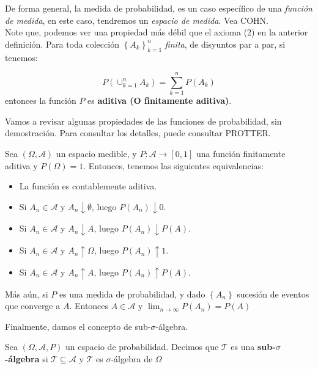 De forma general, la medida de probabilidad, es un caso específico de una \textit{función de medida}, en este caso, tendremos un \textit{espacio de medida}. Vea COHN.\\

Note que, podemos ver una propiedad más débil que el axioma (2) en la anterior definición. Para toda colección $\left\{  A_k \right\}_{k = 1}^{n}$ \textit{finita}, de disyuntos par a par, si tenemos:

\[
	P\left( \cup_{k=1}^n A_k \right) = \sum_{k = 1}^{n} P(A_k)
\]
entonces la función $P$ es \textbf{aditiva (O finitamente aditiva)}.

Vamos a revisar algunas propiedades de las funciones de probabilidad, sin demostración. Para consultar los detalles, puede consultar PROTTER.

\begin{theorem}
	Sea $(\Omega, \mathcal{A})$ un espacio medible, y $P: \mathcal{A} \rightarrow [0,1]$ una función finitamente aditiva y $P(\Omega) = 1$. Entonces, tenemos las siguientes equivalencias:

	\begin{itemize}
		\item La función es contablemente aditiva.
		\item Si $A_n \in \mathcal{A}$ y $A_n \downarrow \emptyset$, luego $P(A_n) \downarrow 0$.
		\item Si $A_n \in \mathcal{A}$ y $A_n \downarrow A$, luego $P(A_n) \downarrow P(A)$.
		\item Si $A_n \in \mathcal{A}$ y $A_n \uparrow \Omega$, luego $P(A_n) \uparrow 1$.
		\item Si $A_n \in \mathcal{A}$ y $A_n \uparrow A$, luego $P(A_n) \uparrow P(A)$.
	\end{itemize}

	Más aún, si $P$ es una medida de probabilidad, y dado $\left\{ A_n \right\}$ sucesión de eventos que converge a $A$. Entonces $A \in \mathcal{A}$ y $\lim_{n \rightarrow \infty} P(A_n) = P(A)$ 

\end{theorem}


Finalmente, damos el concepto de sub-$\sigma$-álgebra.

\begin{boxDef}
	Sea $(\Omega, \mathcal{A}, P)$ un espacio de probabilidad. Decimos que $\mathcal{T}$ es una \textbf{sub-}$\sigma$\textbf{-álgebra} si $\mathcal{T} \subseteq \mathcal{A}$ y $\mathcal{T}$ es $\sigma$-álgebra de $\Omega$
\end{boxDef}


